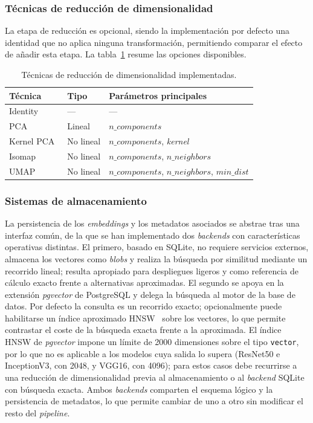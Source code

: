 \subsubsection{Técnicas de reducción de dimensionalidad}
La etapa de reducción es opcional, siendo la implementación por defecto una
identidad que no aplica ninguna transformación, permitiendo comparar el efecto
de añadir esta etapa. La tabla~\ref{tab:reduction} resume las opciones
disponibles.

\begin{table}[h]
\centering
\begin{tabular}{|l|l|l|} \hline
  \textbf{Técnica} & \textbf{Tipo} & \textbf{Parámetros principales} \\ \hline
  Identity & --- & --- \\ \hline
  PCA~\cite{jolliffe_principal_2002} & Lineal & $n\_components$ \\ \hline
  Kernel PCA~\cite{scholkopf_nonlinear_1998} & No lineal & $n\_components$, \textit{kernel} \\ \hline
  Isomap~\cite{tenenbaum_global_2000} & No lineal & $n\_components$, $n\_neighbors$ \\ \hline
  UMAP~\cite{mcinnes_umap_2020} & No lineal & $n\_components$, $n\_neighbors$, $min\_dist$ \\ \hline
\end{tabular}
  \caption{Técnicas de reducción de dimensionalidad implementadas.}
  \label{tab:reduction}
\end{table}

\subsubsection{Sistemas de almacenamiento}
La persistencia de los \textit{embeddings} y los metadatos asociados se abstrae
tras una interfaz común, de la que se han implementado dos \textit{backends}
con características operativas distintas. El primero, basado en SQLite, no
requiere servicios externos, almacena los vectores como \textit{blobs} y
realiza la búsqueda por similitud mediante un recorrido lineal; resulta
apropiado para despliegues ligeros y como referencia de cálculo exacto frente a
alternativas aproximadas. El segundo se apoya en la extensión \textit{pgvector}
de PostgreSQL y delega la búsqueda al motor de la base de datos. Por defecto la
consulta es un recorrido exacto; opcionalmente puede habilitarse un índice
aproximado HNSW~\cite{malkov_efficient_2018} sobre los vectores, lo que permite
contrastar el coste de la búsqueda exacta frente a la aproximada. El índice
HNSW de \textit{pgvector} impone un límite de 2000 dimensiones sobre el tipo
\texttt{vector}, por lo que no es aplicable a los modelos cuya salida lo supera
(ResNet50 e InceptionV3, con 2048, y VGG16, con 4096); para estos casos debe
recurrirse a una reducción de dimensionalidad previa al almacenamiento o al
\textit{backend} SQLite con búsqueda exacta. Ambos \textit{backends} comparten
el esquema lógico y la persistencia de metadatos, lo que permite cambiar de uno
a otro sin modificar el resto del \textit{pipeline}.

